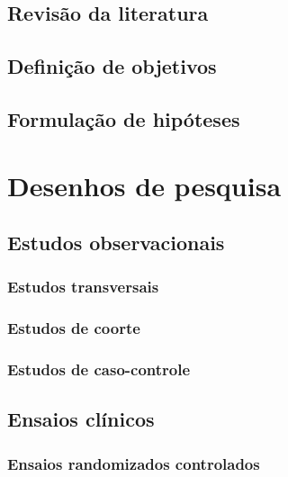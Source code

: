\documentclass[
]{book}
\begin{document}
\section{Revisão da literatura}\label{revisuxe3o-da-literatura}

\section{Definição de objetivos}\label{definiuxe7uxe3o-de-objetivos}

\section{Formulação de hipóteses}\label{formulauxe7uxe3o-de-hipuxf3teses}

\chapter{Desenhos de pesquisa}\label{desenhos-de-pesquisa}

\section{Estudos observacionais}\label{estudos-observacionais}

\subsection{Estudos transversais}\label{estudos-transversais}

\subsection{Estudos de coorte}\label{estudos-de-coorte}

\subsection{Estudos de caso-controle}\label{estudos-de-caso-controle}

\section{Ensaios clínicos}\label{ensaios-cluxednicos}

\subsection{Ensaios randomizados controlados}\label{ensaios-randomizados-controlados}
\end{document}
